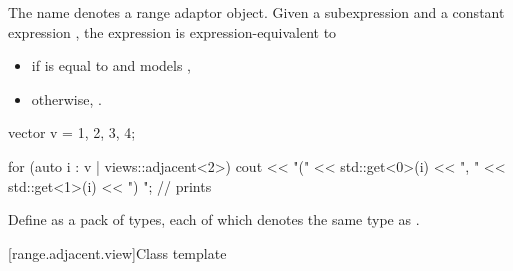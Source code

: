 \pnum
{}%
The name  denotes
a range adaptor object.
Given a subexpression  and a constant expression ,
the expression  is expression-equivalent to
\begin{itemize}
\item
{}
if  is equal to  and
 models ,
\item
otherwise, .
\end{itemize}

\begin{example}
\begin{codeblock}
vector v = {1, 2, 3, 4};

for (auto i : v | views::adjacent<2>) {
  cout << "(" << std::get<0>(i) << ", " << std::get<1>(i) << ") ";  // prints 
}
\end{codeblock}
\end{example}

\pnum
Define  as a pack of  types,
each of which denotes the same type as .

[range.adjacent.view]{Class template }

